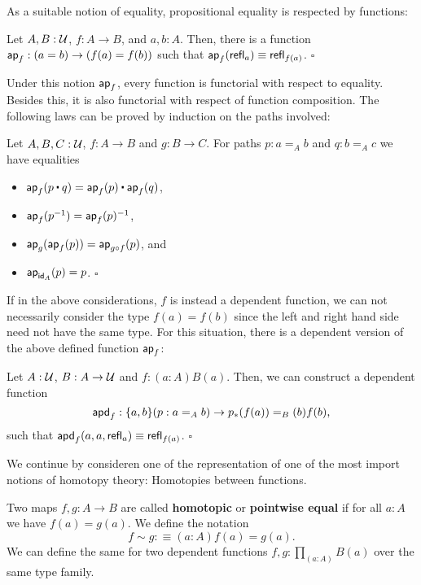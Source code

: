 As a suitable notion of equality, propositional equality is respected by
functions:
\begin{lemma}
Let $A, B : \mathcal{U}$, $f : A \to B$, and $a, b : A$. Then, there is a function
$\mathsf{ap}_f : (a = b) \to (f(a) = f(b))$ such that $\mathsf{ap}_f(\mathsf{refl}_a) \equiv \mathsf{refl}_{f(a)}$.
\hfill $\square$
\end{lemma}

Under this notion $\mathsf{ap}_f$, every function is functorial with respect to
equality.
Besides this, it is also functorial with respect of function composition.
The following laws can be proved by induction on the paths involved:
\begin{lemma}
Let $A, B, C : \mathcal{U}$, $f : A \to B$ and $g : B \to C$. For paths $p : a =_A b$ and
$q : b =_A c$ we have equalities
\begin{itemize}
\item $\ap_f(p \ct q) = \ap_f(p) \ct \ap_f(q)$,
\item $\mathsf{ap}_f(p^{-1}) = \mathsf{ap}_f(p)^{-1}$,
\item $\mathsf{ap}_g(\mathsf{ap}_f(p)) = \mathsf{ap}_{g \circ f}(p)$, and
\item $\mathsf{ap}_{\mathsf{id}_A}(p) = p$. \hfill $\square$
\end{itemize}
\end{lemma}

If in the above considerations, $f$ is instead a dependent function, we can not
necessarily consider the type $f(a) = f(b)$ since the left and right hand side
need not have the same type.
For this situation, there is a dependent version of the above defined function
$\mathsf{ap}_f$:
\begin{lemma}\label{thm:apd-hott}
Let $A : \mathcal{U}$, $B : A \to \mathcal{U}$ and $f : (a : A) B(a)$. Then, we can construct
a dependent function
\begin{equation*}
\mathsf{apd}_f : \{a, b\}(p : a =_A b) \to p_*(f(a)) =_B(b) f(b) \text{,}
\end{equation*}
such that $\mathsf{apd}_f(a, a, \mathsf{refl}_a) \equiv \mathsf{refl}_{f(a)}$. \hfill $\square$
\end{lemma}

We continue by consideren one of the representation of one of the most import
notions of homotopy theory:
Homotopies between functions.
\begin{defn}\label{def:tt-htpy}
Two maps $f, g : A \to B$ are called \textbf{homotopic} or \textbf{pointwise equal}
if for all $a : A$ we have
$f(a) = g(a)$.
We define the notation
\begin{equation*}
f \sim g :\equiv (a : A) f(a) = g(a) \text{.}
\end{equation*}
We can define the same for two dependent functions $f, g : \prod_{(a : A)} B(a)$
over the same type family.
\end{defn}

